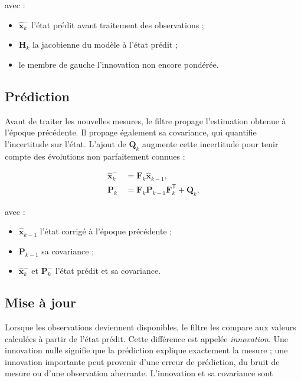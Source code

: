 avec :

\begin{itemize}
    \item $\widehat{\mathbf x}_k^-$ l'état prédit avant traitement des
    observations ;
    \item $\mathbf H_k$ la jacobienne du modèle à l'état prédit ;
    \item le membre de gauche l'innovation non encore pondérée.
\end{itemize}

\subsection{Prédiction}

Avant de traiter les nouvelles mesures, le filtre propage l'estimation obtenue
à l'époque précédente. Il propage également sa covariance, qui quantifie
l'incertitude sur l'état. L'ajout de $\mathbf Q_k$ augmente cette incertitude
pour tenir compte des évolutions non parfaitement connues :

\begin{align}
\widehat{\mathbf x}_k^-
&=
\mathbf F_k\widehat{\mathbf x}_{k-1},
\\
\mathbf P_k^-
&=
\mathbf F_k\mathbf P_{k-1}\mathbf F_k^{\mathsf T}
+\mathbf Q_k.
\label{eq:ekf_predict}
\end{align}

avec :

\begin{itemize}
    \item $\widehat{\mathbf x}_{k-1}$ l'état corrigé à l'époque précédente ;
    \item $\mathbf P_{k-1}$ sa covariance ;
    \item $\widehat{\mathbf x}_k^-$ et $\mathbf P_k^-$ l'état prédit et sa
    covariance.
\end{itemize}

\subsection{Mise à jour}

Lorsque les observations deviennent disponibles, le filtre les compare aux
valeurs calculées à partir de l'état prédit. Cette différence est appelée
\emph{innovation}. Une innovation nulle signifie que la prédiction explique
exactement la mesure ; une innovation importante peut provenir d'une erreur de
prédiction, du bruit de mesure ou d'une observation aberrante. L'innovation et
sa covariance sont

